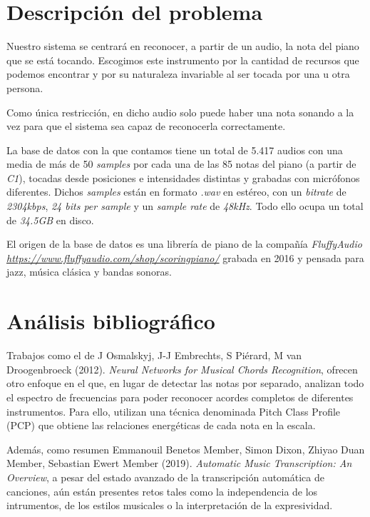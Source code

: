 \documentclass[12pt]{article}
\begin{document}
\newpage

\section{Descripción del problema}
\label{Descripción del problema}

Nuestro sistema se centrará en reconocer, a partir de un audio, la nota del piano que se está tocando. Escogimos este instrumento por la cantidad de recursos
que podemos encontrar y por su naturaleza invariable al ser tocada por una u otra persona.

\bigskip
Como única restricción, en dicho audio solo puede haber una nota sonando a la vez para que el sistema sea capaz de reconocerla correctamente.

\bigskip
La base de datos con la que contamos tiene un total de 5.417 audios con una media de más de 50 \textit{samples} por cada una de las 85 notas del piano (a partir de \textit{C1}), tocadas
desde posiciones e intensidades distintas y grabadas con micrófonos diferentes. Dichos \textit{samples} están en formato \textit{.wav} en estéreo, con un 
\textit{bitrate} de \textit{2304kbps}, \textit{24 bits per sample} y un \textit{sample rate} de \textit{48kHz}. Todo ello ocupa un total de \textit{34.5GB} en disco.

\bigskip
El origen de la base de datos es una librería de piano de la compañía \textit{FluffyAudio} \textit{\url{https://www.fluffyaudio.com/shop/scoringpiano/}} 
grabada en 2016 y pensada para jazz, música clásica y bandas sonoras.

\section{Análisis bibliográfico}
\label{Análisis bibliográfico}

Trabajos como el de J Osmalskyj, J-J Embrechts, S Piérard, M van Droogenbroeck (2012). \textit{Neural Networks for Musical Chords Recognition}, ofrecen otro enfoque
en el que, en lugar de detectar las notas por separado, analizan todo el espectro de frecuencias para poder reconocer acordes completos de diferentes instrumentos.
Para ello, utilizan una técnica denominada Pitch Class Profile (PCP) que obtiene las relaciones energéticas de cada nota en la escala.

\bigskip
Además, como resumen Emmanouil Benetos Member, Simon Dixon, Zhiyao Duan Member, Sebastian Ewert Member (2019). \textit{Automatic Music Transcription: An Overview},
a pesar del estado avanzado de la transcripción automática de canciones, aún están presentes retos tales como la independencia de los intrumentos, de los estilos
musicales o la interpretación de la expresividad.
\end{document}
